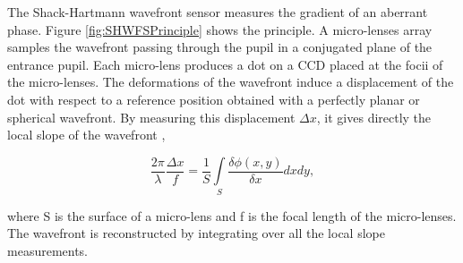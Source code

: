 The Shack-Hartmann wavefront sensor measures the gradient of an aberrant phase. Figure \ref{fig:SHWFSPrinciple} shows the principle. A micro-lenses array samples the wavefront passing through the pupil in a conjugated plane of the entrance pupil. Each micro-lens produces a dot on a CCD placed at the focii of the micro-lenses. The deformations of the wavefront induce a displacement of the dot with respect to a reference position obtained with a perfectly planar or spherical wavefront. By measuring this displacement $\Delta x$, it gives directly the local slope of the wavefront \citep{fontanella1985},

\begin{equation}
\frac{2\pi}{\lambda}\frac{\Delta x}{f} = \frac{1}{S} \int\limits_S \frac{\delta\phi (x,y)}{\delta x}dxdy,
\label{eqt:SHWFSlope}
\end{equation}

where S is the surface of a micro-lens and f is the focal length of the micro-lenses. The wavefront is reconstructed by integrating over all the local slope measurements. 

